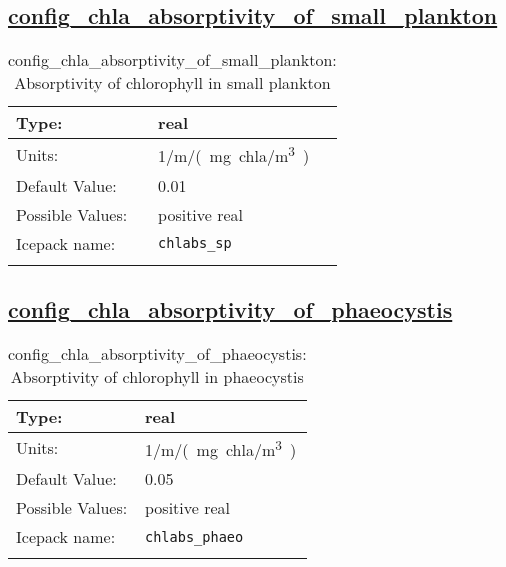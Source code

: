 \subsection[config\_chla\_absorptivity\_of\_small\_plankton]{\hyperref[sec:nm_tab_biogeochemistry]{config\_chla\_absorptivity\_of\_small\_plankton}}
\label{subsec:nm_sec_config_chla_absorptivity_of_small_plankton}
\begin{center}
\begin{longtable}{| p{2.0in} || p{4.0in} |}
    \hline
    Type: & real \\
    \hline
    Units: & \si{1/m/(mg.chla/m^3)} \\
    \hline
    Default Value: & 0.01 \\
    \hline
    Possible Values: & positive real \\
    \hline
    Icepack name: & \verb+chlabs_sp+ \\
    \hline
    \caption{config\_chla\_absorptivity\_of\_small\_plankton: Absorptivity of chlorophyll in small plankton}
\end{longtable}
\end{center}
\subsection[config\_chla\_absorptivity\_of\_phaeocystis]{\hyperref[sec:nm_tab_biogeochemistry]{config\_chla\_absorptivity\_of\_phaeocystis}}
\label{subsec:nm_sec_config_chla_absorptivity_of_phaeocystis}
\begin{center}
\begin{longtable}{| p{2.0in} || p{4.0in} |}
    \hline
    Type: & real \\
    \hline
    Units: & \si{1/m/(mg.chla/m^3)} \\
    \hline
    Default Value: & 0.05 \\
    \hline
    Possible Values: & positive real \\
    \hline
    Icepack name: & \verb+chlabs_phaeo+ \\
    \hline
    \caption{config\_chla\_absorptivity\_of\_phaeocystis: Absorptivity of chlorophyll in phaeocystis}
\end{longtable}
\end{center}
